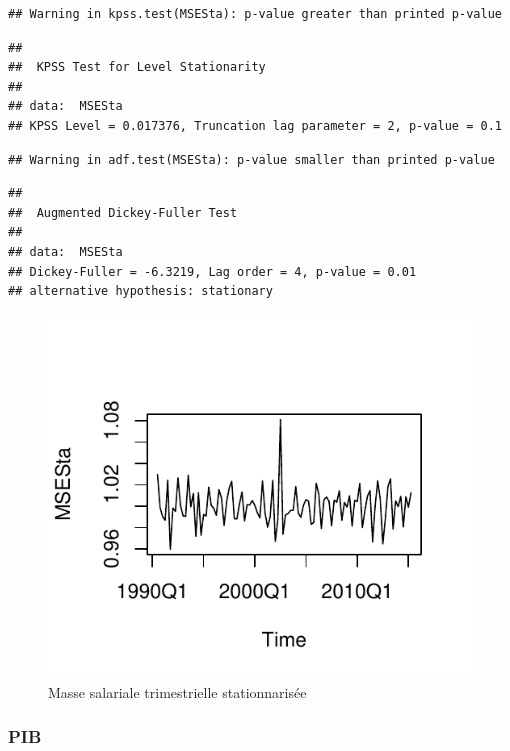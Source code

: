 \documentclass[11pt,]{article}
\begin{document}
\begin{verbatim}
## Warning in kpss.test(MSESta): p-value greater than printed p-value
\end{verbatim}

\begin{verbatim}
## 
##  KPSS Test for Level Stationarity
## 
## data:  MSESta
## KPSS Level = 0.017376, Truncation lag parameter = 2, p-value = 0.1
\end{verbatim}

\begin{verbatim}
## Warning in adf.test(MSESta): p-value smaller than printed p-value
\end{verbatim}

\begin{verbatim}
## 
##  Augmented Dickey-Fuller Test
## 
## data:  MSESta
## Dickey-Fuller = -6.3219, Lag order = 4, p-value = 0.01
## alternative hypothesis: stationary
\end{verbatim}

\begin{figure}[htbp]
\centering
\includegraphics{doc_files/figure-latex/unnamed-chunk-14-1.pdf}
\caption{\label{fig12} Masse salariale trimestrielle stationnarisée}
\end{figure}

\newpage

\subsubsection{PIB}\label{pib-1}
\end{document}
